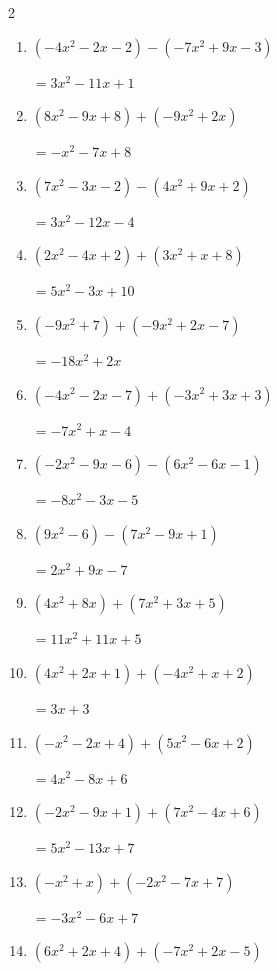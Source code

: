 \begin{multicols}{2}
\begin{enumerate}
        $=-8x^{2}+8x-11$

  \item $(-4x^{2}-2x-2)-(-7x^{2}+9x-3)$

        $=3x^{2}-11x+1$

  \item $(8x^{2}-9x+8)+(-9x^{2}+2x)$

        $=-x^{2}-7x+8$

  \item $(7x^{2}-3x-2)-(4x^{2}+9x+2)$

        $=3x^{2}-12x-4$

  \item $(2x^{2}-4x+2)+(3x^{2}+x+8)$

        $=5x^{2}-3x+10$

  \item $(-9x^{2}+7)+(-9x^{2}+2x-7)$

        $=-18x^{2}+2x$

  \item $(-4x^{2}-2x-7)+(-3x^{2}+3x+3)$

        $=-7x^{2}+x-4$

  \item $(-2x^{2}-9x-6)-(6x^{2}-6x-1)$

        $=-8x^{2}-3x-5$

\columnbreak %

  \item $(9x^{2}-6)-(7x^{2}-9x+1)$

        $=2x^{2}+9x-7$

  \item $(4x^{2}+8x)+(7x^{2}+3x+5)$

        $=11x^{2}+11x+5$

  \item $(4x^{2}+2x+1)+(-4x^{2}+x+2)$

        $=3x+3$

  \item $(-x^{2}-2x+4)+(5x^{2}-6x+2)$

        $=4x^{2}-8x+6$

  \item $(-2x^{2}-9x+1)+(7x^{2}-4x+6)$

        $=5x^{2}-13x+7$

  \item $(-x^{2}+x)+(-2x^{2}-7x+7)$

        $=-3x^{2}-6x+7$

  \item $(6x^{2}+2x+4)+(-7x^{2}+2x-5)$


\end{enumerate}
\end{multicols}
